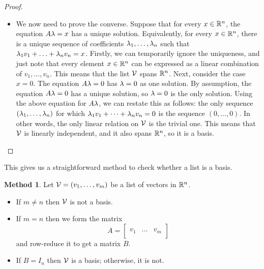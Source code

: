 \documentclass[reqno]{amsart}
\theoremstyle{definition}
\newtheorem{method}[theorem]{Method}
\begin{document}
\begin{proof}
\begin{itemize}
  \item[(b)] We now need to prove the converse.  Suppose that for
   every $x\in{\mathbb{R}}^n$, the equation $A\lambda=x$ has a unique solution.
   Equivalently, for every $x\in{\mathbb{R}}^n$, there is a unique sequence of
   coefficients $\lambda_1,\dotsc,\lambda_n$ such that
   $\lambda_1v_1+\dotsc+\lambda_nv_n=x$.  Firstly, we can temporarily ignore
   the uniqueness, and just note that every element $x\in{\mathbb{R}}^n$ can be
   expressed as a linear combination of $v_1,\dotsc,v_n$.  This means
   that the list $\mathcal{V}$ spans ${\mathbb{R}}^n$.  Next, consider the case $x=0$.
   The equation $A\lambda=0$ has $\lambda=0$ as one solution.  By assumption,
   the equation $A\lambda=0$ has a unique solution, so $\lambda=0$ is the only
   solution.  Using the above equation for $A\lambda$, we can restate this
   as follows: the only sequence $(\lambda_1,\dotsc,\lambda_n)$ for which
   $\lambda_1v_1+\dotsb+\lambda_nv_n=0$ is the sequence $(0,\dotsc,0)$.  In
   other words, the only linear relation on $\mathcal{V}$ is the trivial one.
   This means that $\mathcal{V}$ is linearly independent, and it also spans
   ${\mathbb{R}}^n$, so it is a basis.
   \qedhere
 \end{itemize}
\end{proof}

This gives us a straightforward method to check whether a list is a
basis.
\begin{method}\label{meth-check-basis}
 Let $\mathcal{V}=(v_1,\dotsc,v_m)$ be a list of vectors in ${\mathbb{R}}^n$.
 \begin{itemize}
  \item[(a)] If $m\neq n$ then $\mathcal{V}$ is not a basis.
  \item[(b)] If $m=n$ then we form the matrix
   \[ A = \left[\begin{array}{c|c|c}
                && \\
                v_1 & \dotsc & v_m \\
                &&
              \end{array}\right]
   \]
   and row-reduce it to get a matrix $B$.
  \item[(c)] If $B=I_n$ then $\mathcal{V}$ is a basis; otherwise, it is not.
 \end{itemize}
\end{method}
\end{document}
